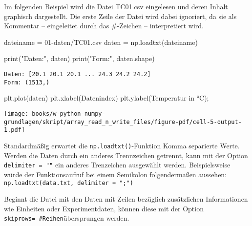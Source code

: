 \documentclass[
  letterpaper,
  DIV=11,
  numbers=noendperiod]{scrreprt}
\newenvironment{Shaded}{\begin{snugshade}}{\end{snugshade}}
\newcommand{\BuiltInTok}[1]{\textcolor[rgb]{0.00,0.23,0.31}{#1}}
\newcommand{\NormalTok}[1]{\textcolor[rgb]{0.00,0.23,0.31}{#1}}
\newcommand{\OperatorTok}[1]{\textcolor[rgb]{0.37,0.37,0.37}{#1}}
\newcommand{\StringTok}[1]{\textcolor[rgb]{0.13,0.47,0.30}{#1}}
\begin{document}
\begin{tcolorbox}
Im folgenden Beispiel wird die Datei
\href{https://firedynamics.github.io/LectureComputerScience/_downloads/0d1a3bfbc82fa134e08585d6151e9f46/TC01.csv}{TC01.csv}
eingelesen und deren Inhalt graphisch dargestellt. Die erste Zeile der
Datei wird dabei ignoriert, da sie als Kommentar -- eingeleitet durch
das \#-Zeichen -- interpretiert wird.

\begin{Shaded}
\begin{Highlighting}[]
\NormalTok{dateiname }\OperatorTok{=} \StringTok{\textquotesingle{}01{-}daten/TC01.csv\textquotesingle{}}
\NormalTok{daten }\OperatorTok{=}\NormalTok{ np.loadtxt(dateiname)}
\end{Highlighting}
\end{Shaded}

\begin{Shaded}
\begin{Highlighting}[]
\BuiltInTok{print}\NormalTok{(}\StringTok{"Daten:"}\NormalTok{, daten)}
\BuiltInTok{print}\NormalTok{(}\StringTok{"Form:"}\NormalTok{, daten.shape)}
\end{Highlighting}
\end{Shaded}

\begin{verbatim}
Daten: [20.1 20.1 20.1 ... 24.3 24.2 24.2]
Form: (1513,)
\end{verbatim}

\begin{Shaded}
\begin{Highlighting}[]
\NormalTok{plt.plot(daten)}
\NormalTok{plt.xlabel(}\StringTok{\textquotesingle{}Datenindex\textquotesingle{}}\NormalTok{)}
\NormalTok{plt.ylabel(}\StringTok{\textquotesingle{}Temperatur in °C\textquotesingle{}}\NormalTok{)}\OperatorTok{;}
\end{Highlighting}
\end{Shaded}

\texttt{[image: books/w-python-numpy-grundlagen/skript/array\_read\_n\_write\_files/figure-pdf/cell-5-output-1.pdf]}

Standardmäßig erwartet die \texttt{np.loadtxt()}-Funktion Komma
separierte Werte. Werden die Daten durch ein anderes Trennzeichen
getrennt, kann mit der Option \texttt{delimiter\ =\ ""} ein anderes
Trenzeichen ausgewählt werden. Beispielsweise würde der Funktionsaufruf
bei einem Semikolon folgendermaßen aussehen:
\texttt{np.loadtxt(data.txt,\ delimiter\ =\ ";")}

Beginnt die Datei mit den Daten mit Zeilen bezüglich zusätzlichen
Informationen wie Einheiten oder Experimentdaten, können diese mit der
Option \texttt{skiprows=\ \#Reihen}übersprungen werden.


\end{tcolorbox}
\end{document}
